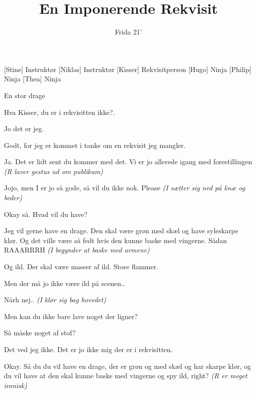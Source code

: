 \documentclass[a4paper,11pt]{article}
\title{En Imponerende Rekvisit}
\author{Frida 21'}
\begin{document}
\maketitle

\begin{roles}
[Stine] Instruktør 
[Niklas] Instruktør
[Kisser] Rekvisitperson
[Hugo] Ninja
[Philip] Ninja
[Thea] Ninja
\end{roles}

\begin{props}
\item En stor drage
\end{props}


\begin{sketch}


 Hva Kisser, du er i rekvisitten ikke?. 

 Jo det er jeg. 

 Godt, for jeg er kommet i tanke om en rekvisit jeg mangler.

 Ja. Det er lidt sent du kommer med det. Vi er jo allerede igang med forestillingen \emph{(R laver gestus ud om publikum)}

 Jojo, men I er jo så gode, så vil du ikke nok. Please \emph{(I sætter sig ned på knæ og beder)}

 Okay så. Hvad vil du have?

 Jeg vil gerne have en drage. Den skal være grøn med skæl og have syleskarpe klør. Og det ville være så fedt hvis den kunne baske med vingerne. Sådan RAAARRRH \emph{(I begynder at baske med armene)}

 Og ild. Der skal være masser af ild. Store flammer. 

 Men der må jo ikke være ild på scenen..

 Nårh nej.. \emph{(I klør sig bag hovedet)}

 Men kan du ikke bare lave noget der ligner?

 Så måske noget af stof?

 Det ved jeg ikke. Det er jo ikke mig der er i rekvisitten.

 Okay. Så du du vil have en drage, der er grøn og med skæl og har skarpe klør, og du vil have at den skal kunne baske med vingerne og spy ild, right? \emph{(R er meget ironisk)}


\end{sketch}
\end{document}
